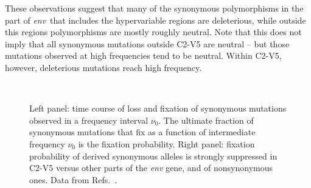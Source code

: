 \documentclass[rmp, twocolumn]{revtex4}
\newcommand{\env}{\textit{env}}
\begin{document}
These observations suggest that many of the synonymous polymorphisms in the part
of \env~that includes the hypervariable regions are deleterious, while outside
this regions polymorphisms are mostly roughly neutral. Note that this does not imply that all 
synonymous mutations outside C2-V5 are neutral -- but those mutations observed
at high frequencies tend to be neutral. Within C2-V5, however, deleterious
mutations reach high frequency.

\begin{figure}
\begin{center}
\\
\caption{Left panel: time course of loss and fixation of synonymous mutations
 observed in a frequency interval $\nu_0$. The ultimate fraction of synonymous
 mutations that fix as a function of intermediate frequency $\nu_0$ is the
 fixation probability.  Right panel: fixation probability of derived synonymous
alleles is strongly suppressed in C2-V5 versus other parts of the {\it env}
gene, and of nonsynonymous ones. Data from
Refs.~\cite{shankarappa_consistent_1999, bunnik_autologous_2008}.}
\label{fig:fixp}
\end{center}
\end{figure}
\end{document}
